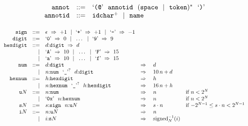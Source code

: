 \vspace{1ex}

$$
\begin{array}[t]{@{}lrrl@{}l@{}l@{}l@{}}
& {\mathtt{annot}} & ::= & \mbox{‘\texttt{{(}@}’}~~{\mathtt{annotid}}~~{({\mathtt{space}} ~~|~~ {\mathtt{token}})^\ast}~~\mbox{‘\texttt{{)}}’} \\
& {\mathtt{annotid}} & ::= & {{\mathtt{idchar}}^{+}} ~~|~~ {\mathtt{name}} \\
\end{array}
$$

\vspace{1ex}

$$
\begin{array}[t]{@{}lrrl@{}l@{}l@{}l@{}}
& {\mathtt{sign}} & ::= & \epsilon ~\Rightarrow~ {+1} ~~|~~ \mbox{‘\texttt{+}’} ~\Rightarrow~ {+1} ~~|~~ \mbox{‘\texttt{{-}}’} ~\Rightarrow~ {-1} \\
& {\mathtt{digit}} & ::= & \mbox{‘\texttt{0}’} ~\Rightarrow~ 0 ~~|~~ \ldots ~~|~~ \mbox{‘\texttt{9}’} ~\Rightarrow~ 9 \\
& {\mathtt{hexdigit}} & ::= & d{:}{\mathtt{digit}} ~\Rightarrow~ d \\
& & | & \mbox{‘\texttt{A}’} ~\Rightarrow~ 10 ~~|~~ \ldots ~~|~~ \mbox{‘\texttt{F}’} ~\Rightarrow~ 15 \\
& & | & \mbox{‘\texttt{a}’} ~\Rightarrow~ 10 ~~|~~ \ldots ~~|~~ \mbox{‘\texttt{f}’} ~\Rightarrow~ 15 \\
& {\mathtt{num}} & ::= & d{:}{\mathtt{digit}} & \quad\Rightarrow\quad{} & d \\
& & | & n{:}{\mathtt{num}}~~{\mbox{‘\texttt{\_}’}^?}~~d{:}{\mathtt{digit}} & \quad\Rightarrow\quad{} & 10 \, n + d \\
& {\mathtt{hexnum}} & ::= & h{:}{\mathtt{hexdigit}} & \quad\Rightarrow\quad{} & h \\
& & | & n{:}{\mathtt{hexnum}}~~{\mbox{‘\texttt{\_}’}^?}~~h{:}{\mathtt{hexdigit}} & \quad\Rightarrow\quad{} & 16 \, n + h \\
& {{\mathtt{u}}}{N} & ::= & n{:}{\mathtt{num}} & \quad\Rightarrow\quad{} & n & \quad \mbox{if}~ n < {2^{N}} \\
& & | & \mbox{‘\texttt{0x}’}~~n{:}{\mathtt{hexnum}} & \quad\Rightarrow\quad{} & n & \quad \mbox{if}~ n < {2^{N}} \\
& {{\mathtt{s}}}{N} & ::= & s{:}{\mathtt{sign}}~~n{:}{{\mathtt{u}}}{N} & \quad\Rightarrow\quad{} & s \cdot n & \quad \mbox{if}~ {-{2^{N - 1}}} \leq s \cdot n < {2^{N - 1}} \\
& {{\mathtt{i}}}{N} & ::= & n{:}{{\mathtt{u}}}{N} & \quad\Rightarrow\quad{} & n \\
& & | & i{:}{{\mathtt{s}}}{N} & \quad\Rightarrow\quad{} & {{{{\mathrm{signed}}}_{N}^{{-1}}}}{(i)} \\
\end{array}
$$


